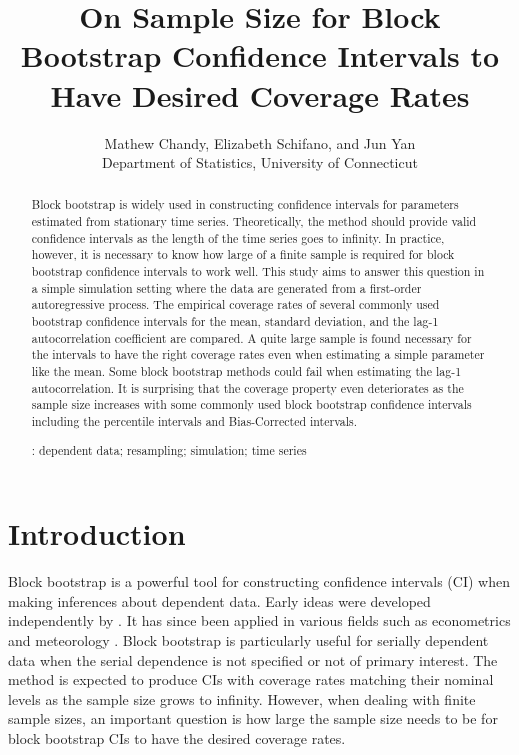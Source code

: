 \documentclass[12pt, letterpaper, titlepage]{article}
\title{On Sample Size for Block Bootstrap Confidence Intervals 
  to Have Desired Coverage Rates}
\author{Mathew Chandy, Elizabeth Schifano,
  and Jun Yan\\[1ex]
  Department of Statistics, University of Connecticut\\
}
\date{}
\begin{document}
 
\maketitle


\begin{abstract}
Block bootstrap is widely used in constructing confidence intervals for
parameters estimated from stationary time series. Theoretically, the method
should provide valid confidence intervals as the length of the time series goes
to infinity. In practice, however, it is necessary to know how large of a finite
sample is required for block bootstrap confidence intervals to work well. This
study aims to answer this question in a simple simulation setting where the data
are generated from a first-order autoregressive process. The empirical coverage
rates of several commonly used bootstrap confidence intervals for the mean,
standard deviation, and the lag-1 autocorrelation coefficient are compared.
A quite large sample is found necessary for the intervals to have the right
coverage rates even when estimating a simple parameter like the mean. Some
block bootstrap methods could fail when estimating the lag-1 autocorrelation.
It is surprising that the coverage property even deteriorates as the sample size
increases with some commonly used block bootstrap confidence intervals
including the percentile intervals and Bias-Corrected intervals.


\bigskip
{}:
dependent data; resampling; simulation; time series
\end{abstract}


\doublespace


\section{Introduction}
\label{sec:intro}


Block bootstrap is a powerful tool for constructing confidence intervals (CI)
when making inferences about dependent data. Early ideas were developed
independently by 
\citet{hall1985resampling, carlstein1986use,ckunsch1989jackknife}.
It has since been applied in various fields such as econometrics
\citep{mackinnon2006bootstrap} and meteorology \citep{varga2017generalised}.
Block bootstrap is particularly useful for serially dependent
data when the serial dependence is not specified or not of primary interest.
The method is expected to produce CIs with coverage rates
matching their nominal levels as the sample size grows to infinity. However,
when dealing with finite sample sizes, an important question is how large the
sample size needs to be for block bootstrap CIs to have the
desired coverage rates.
\end{document}
